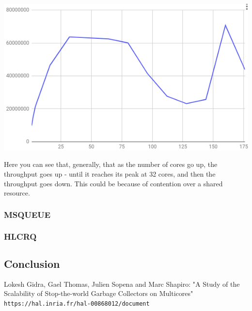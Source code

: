 \documentclass{article}
\begin{document}
 \includegraphics[width=\textwidth]{graph-no-changes.png}

 Here you can see that, generally, that as the number of cores go up, the throughput goes up - until it reaches its peak at 32 cores, and then the throughput goes down. This could be because of contention over a shared resource.
 

 \subsubsection{MSQUEUE}

 \subsubsection{HLCRQ}

 \subsection{Conclusion}

  \medskip
  \newpage

  \begin{thebibliography}{9}
      Lokesh Gidra, Gael Thomas, Julien Sopena and Marc Shapiro: "A Study of the Scalability of Stop-the-world Garbage Collectors on Multicores"
      \\\texttt{https://hal.inria.fr/hal-00868012/document}
  \end{thebibliography}
\end{document}
